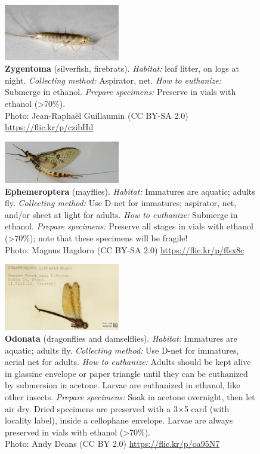\documentclass[letterpaper, 11pt]{article}
\begin{document}
\begin{figure}
  \caption{\textbf{Zygentoma} (silverfish, firebrats). \textit{Habitat:} leaf litter, on logs at night. \textit{Collecting method:} Aspirator, net. \textit{How to euthanize:} Submerge in ethanol. \textit{Prepare specimens:} Preserve in vials with ethanol (\textgreater70\%).\\ Photo: Jean-Rapha\"{e}l Guillaumin (CC BY-SA 2.0) \url{https://flic.kr/p/czibHd}}
  \includegraphics[width=0.45\textwidth]{Zygentoma}
\end{figure}

\begin{figure}
  \caption{\textbf{Ephemeroptera} (mayflies). \textit{Habitat:} Immatures are aquatic; adults fly. \textit{Collecting method:} Use D-net for immatures; aspirator, net, and/or sheet at light for adults. \textit{How to euthanize:} Submerge in ethanol. \textit{Prepare specimens:} Preserve all stages in vials with ethanol (\textgreater70\%); note that these specimens will be fragile!\\ Photo: Magnus Hagdorn (CC BY-SA 2.0) \url{https://flic.kr/p/ffsx8c}}
  \includegraphics[width=0.45\textwidth]{Ephemeroptera}
\end{figure}

\clearpage

\begin{figure}
  \caption{\textbf{Odonata} (dragonflies and damselflies). \textit{Habitat:} Immatures are aquatic; adults fly. \textit{Collecting method:} Use D-net for immatures, aerial net for adults. \textit{How to euthanize:} Adults should be kept alive in glassine envelope or paper triangle until they can be euthanized by submersion in acetone. Larvae are euthanized in ethanol, like other insects. \textit{Prepare specimens:} Soak in acetone overnight, then let air dry. Dried specimens are preserved with a 3$\times$5 card (with locality label), inside a cellophane envelope. Larvae are always preserved in vials with ethanol (\textgreater70\%).\\ Photo: Andy Deans (CC BY 2.0) \url{https://flic.kr/p/oa95N7}}
  \includegraphics[width=0.45\textwidth]{Odonata}
\end{figure}
\end{document}
